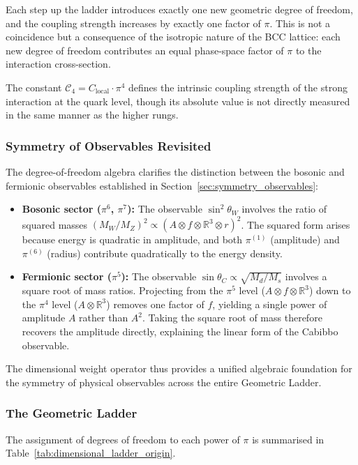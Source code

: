 \documentclass[10pt,a4paper]{article}
\begin{document}
Each step up the ladder introduces exactly one new geometric degree of freedom, 
and the coupling strength increases by exactly one factor of $\pi$. This is 
not a coincidence but a consequence of the isotropic nature of the BCC 
lattice: each new degree of freedom contributes an equal phase-space factor 
of $\pi$ to the interaction cross-section.

The constant $\mathcal{C}_4 = C_{\text{local}} \cdot \pi^4$ defines the 
intrinsic coupling strength of the strong interaction at the quark level, 
though its absolute value is not directly measured in the same manner as 
the higher rungs.

\subsubsection*{Symmetry of Observables Revisited}

The degree-of-freedom algebra clarifies the distinction between the bosonic 
and fermionic observables established in 
Section~\ref{sec:symmetry_observables}:

\begin{itemize}
	\item \textbf{Bosonic sector ($\pi^6$, $\pi^7$):} The observable 
	$\sin^2\theta_W$ involves the ratio of squared masses 
	$(M_W/M_Z)^2 \propto (A \otimes f \otimes \mathbb{R}^3 \otimes r)^2$. 
	The squared form arises because energy is quadratic in amplitude, 
	and both $\pi^{(1)}$ (amplitude) and $\pi^{(6)}$ (radius) contribute 
	quadratically to the energy density.
	
	\item \textbf{Fermionic sector ($\pi^5$):} The observable 
	$\sin\theta_C \propto \sqrt{M_d/M_s}$ involves a square root of mass 
	ratios. Projecting from the $\pi^5$ level 
	($A \otimes f \otimes \mathbb{R}^3$) down to the $\pi^4$ level 
	($A \otimes \mathbb{R}^3$) removes one factor of $f$, yielding a 
	single power of amplitude $A$ rather than $A^2$. Taking the square 
	root of mass therefore recovers the amplitude directly, explaining 
	the linear form of the Cabibbo observable.
\end{itemize}

\noindent The dimensional weight operator thus provides a unified algebraic 
foundation for the symmetry of physical observables across the entire 
Geometric Ladder.

\subsubsection*{The Geometric Ladder}
The assignment of degrees of freedom to each power of $\pi$ is summarised in 
Table~\ref{tab:dimensional_ladder_origin}.
\end{document}
